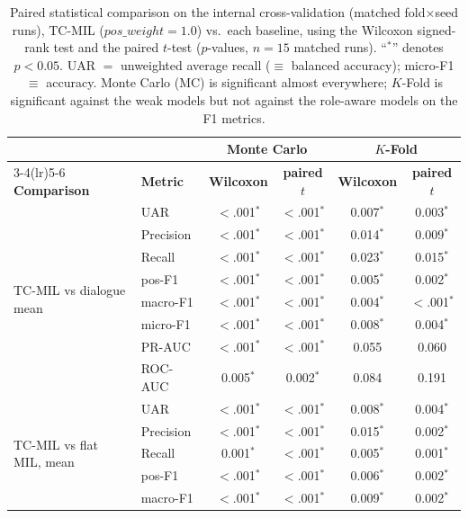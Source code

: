 \documentclass[conference]{IEEEtran}
\begin{document}
\begin{table}[tp]
\caption{Paired statistical comparison on the internal cross-validation
(matched fold$\times$seed runs), TC-MIL ($pos\_weight\!=\!1.0$) vs.\ each
baseline, using the Wilcoxon signed-rank test and the paired $t$-test
($p$-values, $n=15$ matched runs). ``$^{*}$'' denotes $p<0.05$. UAR $=$
unweighted average recall ($\equiv$ balanced accuracy); micro-F1 $\equiv$
accuracy. Monte Carlo (MC) is significant almost everywhere; $K$-Fold is
significant against the weak models but not against the role-aware models on
the F1 metrics.}
\label{tab:cvstats}
\centering
\scriptsize
\setlength{\tabcolsep}{4pt}
\begin{tabular}{@{}ll cc cc@{}}
\toprule
& & \multicolumn{2}{c}{\textbf{Monte Carlo}} & \multicolumn{2}{c}{\textbf{$K$-Fold}} \\
\cmidrule(lr){3-4}\cmidrule(lr){5-6}
\textbf{Comparison} & \textbf{Metric} & \textbf{Wilcoxon} & \textbf{paired $t$} & \textbf{Wilcoxon} & \textbf{paired $t$} \\
\midrule
\multirow{8}{*}{TC-MIL vs dialogue mean}
 & UAR & $<$.001$^{*}$ & $<$.001$^{*}$ & 0.007$^{*}$ & 0.003$^{*}$ \\
 & Precision & $<$.001$^{*}$ & $<$.001$^{*}$ & 0.014$^{*}$ & 0.009$^{*}$ \\
 & Recall & $<$.001$^{*}$ & $<$.001$^{*}$ & 0.023$^{*}$ & 0.015$^{*}$ \\
 & pos-F1 & $<$.001$^{*}$ & $<$.001$^{*}$ & 0.005$^{*}$ & 0.002$^{*}$ \\
 & macro-F1 & $<$.001$^{*}$ & $<$.001$^{*}$ & 0.004$^{*}$ & $<$.001$^{*}$ \\
 & micro-F1 & $<$.001$^{*}$ & $<$.001$^{*}$ & 0.008$^{*}$ & 0.004$^{*}$ \\
 & PR-AUC & $<$.001$^{*}$ & $<$.001$^{*}$ & 0.055 & 0.060 \\
 & ROC-AUC & 0.005$^{*}$ & 0.002$^{*}$ & 0.084 & 0.191 \\
\midrule
\multirow{8}{*}{TC-MIL vs flat MIL, mean}
 & UAR & $<$.001$^{*}$ & $<$.001$^{*}$ & 0.008$^{*}$ & 0.004$^{*}$ \\
 & Precision & $<$.001$^{*}$ & $<$.001$^{*}$ & 0.015$^{*}$ & 0.002$^{*}$ \\
 & Recall & 0.001$^{*}$ & $<$.001$^{*}$ & 0.005$^{*}$ & 0.001$^{*}$ \\
 & pos-F1 & $<$.001$^{*}$ & $<$.001$^{*}$ & 0.006$^{*}$ & 0.002$^{*}$ \\
 & macro-F1 & $<$.001$^{*}$ & $<$.001$^{*}$ & 0.009$^{*}$ & 0.002$^{*}$ \\

\end{tabular}
\end{table}
\end{document}
